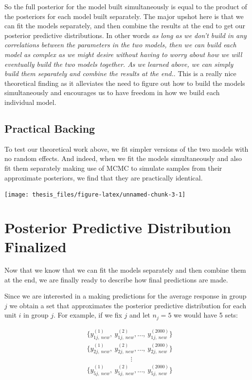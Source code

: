 \documentclass[12pt,twoside]{reedthesis}
\begin{document}
So the full posterior for the model built simultaneously is equal to the product of the posteriors for each model built separately. The major upshot here is that we can fit the models separately, and then combine the results at the end to get our posterior predictive distributions. In other words \emph{as long as we don't build in any correlations between the parameters in the two models, then we can build each model as complex as we might desire without having to worry about how we will eventually build the two models together. As we learned above, we can simply build them separately and combine the results at the end.}. This is a really nice theoretical finding as it alleviates the need to figure out how to build the models simultaneously and encourages us to have freedom in how we build each individual model.

\hypertarget{practical-backing}{%
\subsection{Practical Backing}\label{practical-backing}}

To test our theoretical work above, we fit simpler versions of the two models with no random effects. And indeed, when we fit the models simultaneously and also fit them separately making use of MCMC to simulate samples from their approximate posteriors, we find that they are practically identical.
\begin{center}\texttt{[image: thesis\_files/figure-latex/unnamed-chunk-3-1]} \end{center}

\hypertarget{posterior-predictive-distribution-finalized}{%
\section{Posterior Predictive Distribution Finalized}\label{posterior-predictive-distribution-finalized}}

Now that we know that we can fit the models separately and then combine them at the end, we are finally ready to describe how final predictions are made.

Since we are interested in a making predictions for the average response in group \(j\) we obtain a set that approximates the posterior predictive distribution for each unit \(i\) in group \(j\). For example, if we fix \(j\) and let \(n_j = 5\) we would have 5 sets:

\[
\begin{aligned}
&\Big\{y_{1j , \ new}^{(1)}, \ y_{1j, \ new}^{(2)}, ..., \ y_{1j, \ new}^{(2000)}\Big\} \\
&\Big\{y_{2j , \ new}^{(1)}, \ y_{2j, \ new}^{(2)}, ...,  \ y_{2j, \ new}^{(2000)}\Big\} \\
& \qquad \qquad \qquad \ \   \vdots \\
&\Big\{y_{5j , \ new}^{(1)}, \ y_{5j, \ new}^{(2)}, ..., \ y_{5j, \ new}^{(2000)}\Big\}
\end{aligned}
\]
\end{document}
